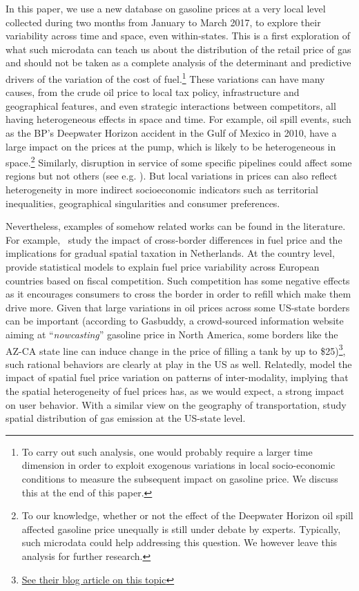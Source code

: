 \documentclass[10pt]{article}
\begin{document}
In this paper, we use a new database on gasoline prices at a very local level collected during two months from January to March 2017, to explore their variability across time and space, even within-states. This is a first exploration of what such microdata can teach us about the distribution of the retail price of gas and should not be taken as a complete analysis of the determinant and predictive drivers of the variation of the cost of fuel.\footnote{To carry out such analysis, one would probably require a larger time dimension in order to exploit exogenous variations in local socio-economic conditions to measure the subsequent impact on gasoline price. We discuss this at the end of this paper.} These variations can have many causes, from the crude oil price to local tax policy, infrastructure and geographical features, and even strategic interactions between competitors, all having heterogeneous effects in space and time. For example, oil spill events, such as the BP's Deepwater Horizon accident in the Gulf of Mexico in 2010, have a large impact on the prices at the pump, which is likely to be heterogeneous in space.\footnote{To our knowledge, whether or not the effect of the Deepwater Horizon oil spill affected gasoline price unequally is still under debate by experts. Typically, such microdata could help addressing this question. We however leave this analysis for further research.} Similarly, disruption in service of some specific pipelines could affect some regions but not others (see e.g. \citealt{McRae2017}). But local variations in prices can also reflect heterogeneity in more indirect socioeconomic indicators such as territorial inequalities, geographical singularities and consumer preferences.

Nevertheless, examples of somehow related works can be found in the literature. For example,~\cite{rietveld2001spatial} study the impact of cross-border differences in fuel price and the implications for gradual spatial taxation in Netherlands. At the country level, \cite{rietveld2005fuel} provide statistical models to explain fuel price variability across European countries based on fiscal competition. Such competition has some negative effects as it encourages consumers to cross the border in order to refill which make them drive more. Given that large variations in oil prices across some US-state borders can be important (according to Gasbuddy, a crowd-sourced information website aiming at ``\textit{nowcasting}'' gasoline price in North America, some borders like the AZ-CA state line can induce change in the price of filling a tank by up to \$25)\footnote{\href{https://business.gasbuddy.com/blog\-overpaying\-across-us-borders/}{See their blog article on this topic}}, such rational behaviors are clearly at play in the US as well. Relatedly, \cite{macharis2010decision} model the impact of spatial fuel price variation on patterns of inter-modality, implying that the spatial heterogeneity of fuel prices has, as we would expect, a strong impact on user behavior. With a similar view on the geography of transportation, \cite{gregg2009temporal} study spatial distribution of gas emission at the US-state level.
\end{document}
